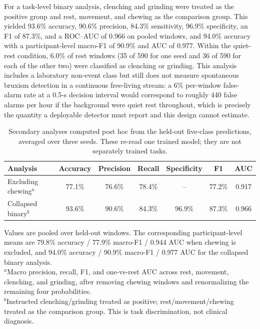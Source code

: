 \documentclass[pdflatex,sn-nature,iicol]{sn-jnl}
\begin{document}
For a task-level binary analysis, clenching and grinding were treated as the positive group and rest, movement, and chewing as the comparison group. This yielded 93.6\% accuracy, 90.6\% precision, 84.3\% sensitivity, 96.9\% specificity, an F1 of 87.3\%, and a ROC--AUC of 0.966 on pooled windows, and 94.0\% accuracy with a participant-level macro-F1 of 90.9\% and AUC of 0.977. Within the quiet-rest condition, 6.0\% of rest windows (35 of 590 for one seed and 36 of 590 for each of the other two) were classified as clenching or grinding. This analysis includes a laboratory non-event class but still does not measure spontaneous bruxism detection in a continuous free-living stream: a 6\% per-window false-alarm rate at a 0.5-s decision interval would correspond to roughly 440 false alarms per hour if the background were quiet rest throughout, which is precisely the quantity a deployable detector must report and this design cannot estimate.

\begin{table}[h]
  \caption{Secondary analyses computed post hoc from the held-out five-class predictions, averaged over three seeds. These re-read one trained model; they are not separately trained tasks.}
  \label{tab:sensitivity}
  \centering
  \begin{tabular}{lcccccc}
    \toprule
    Analysis & Accuracy & Precision & Recall & Specificity & F1 & AUC \\
    \midrule
    Excluding chewing$^{a}$ & 77.1\% & 76.6\% & 78.4\% & -- & 77.2\% & 0.917 \\
    Collapsed binary$^{b}$ & 93.6\% & 90.6\% & 84.3\% & 96.9\% & 87.3\% & 0.966 \\
    \bottomrule
  \end{tabular}
  \begin{flushleft}\footnotesize
  Values are pooled over held-out windows. The corresponding participant-level means are 79.8\% accuracy / 77.9\% macro-F1 / 0.944 AUC when chewing is excluded, and 94.0\% accuracy / 90.9\% macro-F1 / 0.977 AUC for the collapsed binary analysis.\\
  $^{a}$Macro precision, recall, F1, and one-vs-rest AUC across rest, movement, clenching, and grinding, after removing chewing windows and renormalizing the remaining four probabilities.\\
  $^{b}$Instructed clenching/grinding treated as positive; rest/movement/chewing treated as the comparison group. This is task discrimination, not clinical diagnosis.
  \end{flushleft}
\end{table}
\end{document}
